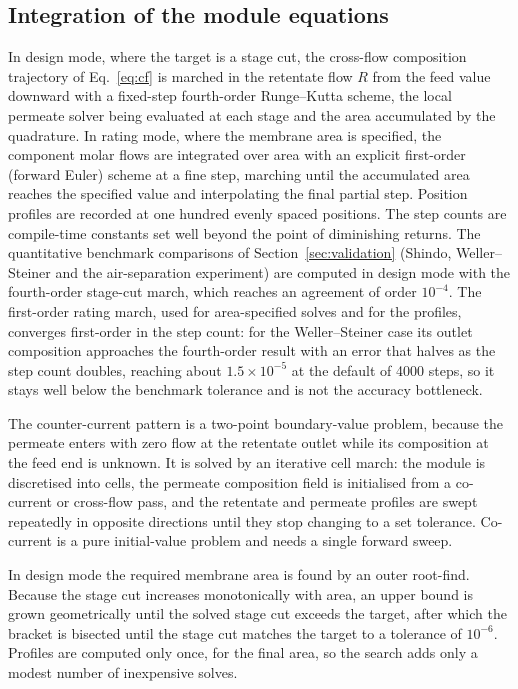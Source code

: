 \documentclass[a4paper,fleqn]{cas-dc}
\begin{document}
\subsection{Integration of the module equations}\label{sec:numerics-march}
In design mode, where the target is a stage cut, the cross-flow composition
trajectory of Eq.~\eqref{eq:cf} is marched in the retentate flow $R$ from the
feed value downward with a fixed-step fourth-order Runge--Kutta scheme, the local
permeate solver being evaluated at each stage and the area accumulated by the
quadrature. In rating mode, where the membrane area is specified, the component
molar flows are integrated over area with an explicit first-order (forward Euler)
scheme at a fine step, marching until the accumulated area reaches the specified
value and interpolating the final partial step. Position profiles are recorded at
one hundred evenly spaced positions. The step counts are compile-time constants
set well beyond the point of diminishing returns. The quantitative benchmark
comparisons of Section~\ref{sec:validation} (Shindo, Weller--Steiner and the
air-separation experiment) are computed in design mode with the fourth-order
stage-cut march, which reaches an agreement of order $10^{-4}$. The first-order
rating march, used for area-specified solves and for the profiles, converges
first-order in the step count: for the Weller--Steiner case its outlet
composition approaches the fourth-order result with an error that halves as the
step count doubles, reaching about $1.5\times10^{-5}$ at the default of 4000 steps,
so it stays well below the benchmark tolerance and is not the accuracy
bottleneck.

The counter-current pattern is a two-point boundary-value problem, because the
permeate enters with zero flow at the retentate outlet while its composition at
the feed end is unknown. It is solved by an iterative cell march: the module is
discretised into cells, the permeate composition field is initialised from a
co-current or cross-flow pass, and the retentate and permeate profiles are swept
repeatedly in opposite directions until they stop changing to a set tolerance.
Co-current is a pure initial-value problem and needs a single forward sweep.

In design mode the required membrane area is found by an outer root-find. Because
the stage cut increases monotonically with area, an upper bound is grown
geometrically until the solved stage cut exceeds the target, after which the
bracket is bisected until the stage cut matches the target to a tolerance of
$10^{-6}$. Profiles are computed only once, for the final area, so the search
adds only a modest number of inexpensive solves.
\end{document}
